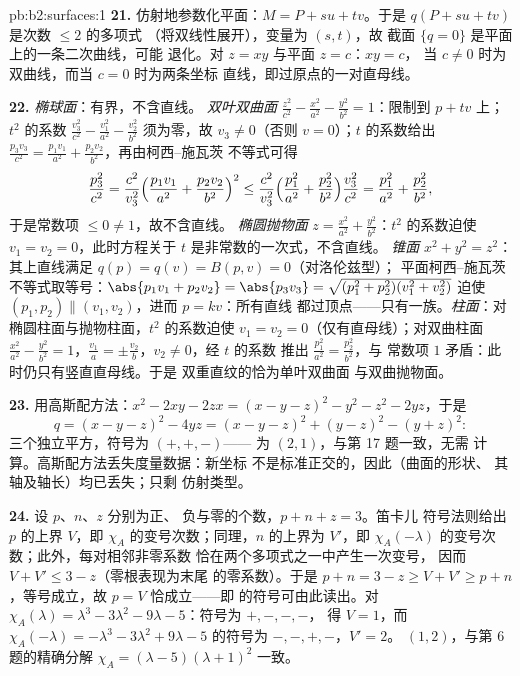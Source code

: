 \begin{solution}{pb:b2:surfaces:1}
\textbf{21.} 仿射地参数化平面：$M = P + su +
tv$。于是 $q(P + su + tv)$ 是次数 $\leq 2$ 的多项式
（将双线性展开），变量为 $(s, t)$，故
截面 $\{q = 0\}$ 是平面上的一条二次曲线，可能
退化。对 $z = xy$ 与平面 $z = c$：$xy = c$，
当 $c \neq 0$ 时为双曲线，而当 $c = 0$ 时为两条坐标
直线，即过原点的一对直母线。

\textbf{22.} \emph{椭球面}：有界，不含直线。
\emph{双叶双曲面} $\frac{z^2}{c^2} -
\frac{x^2}{a^2} - \frac{y^2}{b^2} = 1$：限制到 $p + tv$ 上；
$t^2$ 的系数 $\frac{v_3^2}{c^2} - \frac{v_1^2}{a^2}
- \frac{v_2^2}{b^2}$ 须为零，故 $v_3 \neq 0$（否则 $v =
0$）；$t$ 的系数给出 $\frac{p_3v_3}{c^2} =
\frac{p_1v_1}{a^2} + \frac{p_2v_2}{b^2}$，再由柯西–施瓦茨
不等式可得
\[
\frac{p_3^2}{c^2}
= \frac{c^2}{v_3^2}\Bigl(\frac{p_1v_1}{a^2} +
\frac{p_2v_2}{b^2}\Bigr)^2
\leq \frac{c^2}{v_3^2}\Bigl(\frac{p_1^2}{a^2} +
\frac{p_2^2}{b^2}\Bigr)\frac{v_3^2}{c^2}
= \frac{p_1^2}{a^2} + \frac{p_2^2}{b^2},
\]
于是常数项 $\leq 0 \neq 1$，故不含直线。
\emph{椭圆抛物面} $z = \frac{x^2}{a^2} +
\frac{y^2}{b^2}$：$t^2$ 的系数迫使 $v_1 = v_2 =
0$，此时方程关于 $t$ 是非常数的一次式，不含直线。
\emph{锥面} $x^2 + y^2 = z^2$：其上直线满足 $q(p) =
q(v) = B(p, v) = 0$（对洛伦兹型）；
平面柯西–施瓦茨不等式取等号：$\abs{p_1v_1 + p_2v_2} = \abs{p_3v_3} =
\sqrt{(p_1^2 + p_2^2)(v_1^2 + v_2^2)}$ 迫使 $(p_1, p_2)
\parallel (v_1, v_2)$，进而 $p = kv$：所有直线
都过顶点——只有一族。\emph{柱面}：对
椭圆柱面与抛物柱面，$t^2$ 的系数迫使
$v_1 = v_2 = 0$（仅有直母线）；对双曲柱面
$\frac{x^2}{a^2} - \frac{y^2}{b^2} = 1$，$\frac{v_1}a = \pm
\frac{v_2}b$，$v_2 \neq 0$，经 $t$ 的系数
推出 $\frac{p_1^2}{a^2} = \frac{p_2^2}{b^2}$，与
常数项 $1$ 矛盾：此时仍只有竖直直母线。于是
双重直纹的恰为单叶双曲面
与双曲抛物面。

\textbf{23.} 用高斯配方法：$x^2 - 2xy - 2zx = (x - y - z)^2 - y^2 -
z^2 - 2yz$，于是
\[
q = (x - y - z)^2 - 4yz = (x - y - z)^2 + (y - z)^2 - (y +
z)^2 :
\]
三个独立平方，符号为 $(+, +, -)$——
为 $(2, 1)$，与第 17 题一致，无需
计算。高斯配方法丢失度量数据：新坐标
不是标准正交的，因此（曲面的形状、
其轴及轴长）均已丢失；只剩
仿射类型。

\textbf{24.} 设 $p$、$n$、$z$ 分别为正、
负与零的个数，$p + n + z = 3$。笛卡儿
符号法则给出 $p$ 的上界 $V$，即
$\chi_A$ 的变号次数；同理，$n$ 的上界为 $V'$，即
$\chi_A(-\lambda)$ 的变号次数；此外，每对相邻非零系数
恰在两个多项式之一中产生一次变号，
因而 $V + V' \leq 3 - z$（零根表现为末尾
的零系数）。于是 $p + n = 3 - z \geq
V + V' \geq p + n$，等号成立，故 $p = V$ 恰成立——即
的符号可由此读出。对 $\chi_A(\lambda)
= \lambda^3 - 3\lambda^2 - 9\lambda - 5$：符号为 $+,-,-,-$，
得 $V = 1$，而 $\chi_A(-\lambda) = -\lambda^3 - 3\lambda^2
+ 9\lambda - 5$ 的符号为 $-,-,+,-$，$V' = 2$。 $(1,
2)$，与第 6 题的精确分解 $\chi_A =
(\lambda - 5)(\lambda + 1)^2$ 一致。


\end{solution}
